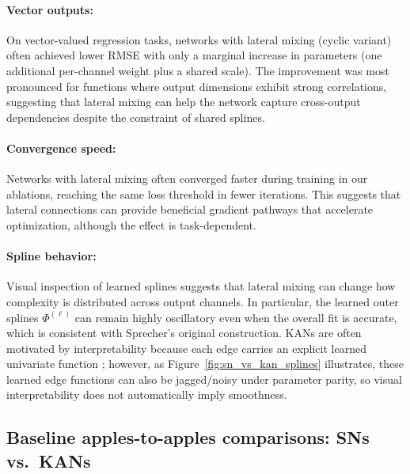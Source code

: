 \documentclass{article}
\theoremstyle{plain}
\theoremstyle{definition}
\theoremstyle{remark}
\begin{document}
\paragraph{Vector outputs:} On vector-valued regression tasks, networks with lateral mixing (cyclic variant) often achieved lower RMSE with only a marginal increase in parameters (one additional per-channel weight plus a shared scale). The improvement was most pronounced for functions where output dimensions exhibit strong correlations, suggesting that lateral mixing can help the network capture cross-output dependencies despite the constraint of shared splines.

\paragraph{Convergence speed:} Networks with lateral mixing often converged faster during training in our ablations, reaching the same loss threshold in fewer iterations. This suggests that lateral connections can provide beneficial gradient pathways that accelerate optimization, although the effect is task-dependent.

\paragraph{Spline behavior:} Visual inspection of learned splines suggests that lateral mixing can change how complexity is distributed across output channels. In particular, the learned outer splines $\Phi^{(\ell)}$ can remain highly oscillatory even when the overall fit is accurate, which is consistent with Sprecher's original construction. KANs are often motivated by interpretability because each edge carries an explicit learned univariate function \cite{liu2024kan}; however, as Figure~\ref{fig:sn_vs_kan_splines} illustrates, these learned edge functions can also be jagged/noisy under parameter parity, so visual interpretability does not automatically imply smoothness.

\subsection{Baseline apples-to-apples comparisons: SNs vs.\ KANs}\label{sec:sn-kan-baselines}
\end{document}

